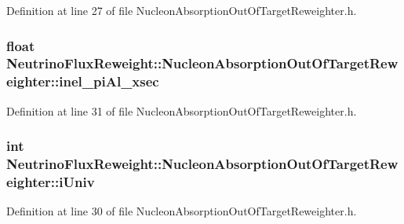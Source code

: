 Definition at line 27 of file Nucleon\-Absorption\-Out\-Of\-Target\-Reweighter.\-h.

\hypertarget{class_neutrino_flux_reweight_1_1_nucleon_absorption_out_of_target_reweighter_a6e402e4d30132d0ccc65bc74e5add535}{
\subsubsection[{inel\-\_\-pi\-Al\-\_\-xsec}]{\setlength{\rightskip}{0pt plus 5cm}float Neutrino\-Flux\-Reweight\-::\-Nucleon\-Absorption\-Out\-Of\-Target\-Reweighter\-::inel\-\_\-pi\-Al\-\_\-xsec\hspace{0.3cm}{\ttfamily [private]}}}\label{class_neutrino_flux_reweight_1_1_nucleon_absorption_out_of_target_reweighter_a6e402e4d30132d0ccc65bc74e5add535}


Definition at line 31 of file Nucleon\-Absorption\-Out\-Of\-Target\-Reweighter.\-h.

\hypertarget{class_neutrino_flux_reweight_1_1_nucleon_absorption_out_of_target_reweighter_a2b89b90d5bbc264d931574f752a51b7b}{
\subsubsection[{i\-Univ}]{\setlength{\rightskip}{0pt plus 5cm}int Neutrino\-Flux\-Reweight\-::\-Nucleon\-Absorption\-Out\-Of\-Target\-Reweighter\-::i\-Univ\hspace{0.3cm}{\ttfamily [private]}}}\label{class_neutrino_flux_reweight_1_1_nucleon_absorption_out_of_target_reweighter_a2b89b90d5bbc264d931574f752a51b7b}


Definition at line 30 of file Nucleon\-Absorption\-Out\-Of\-Target\-Reweighter.\-h.


